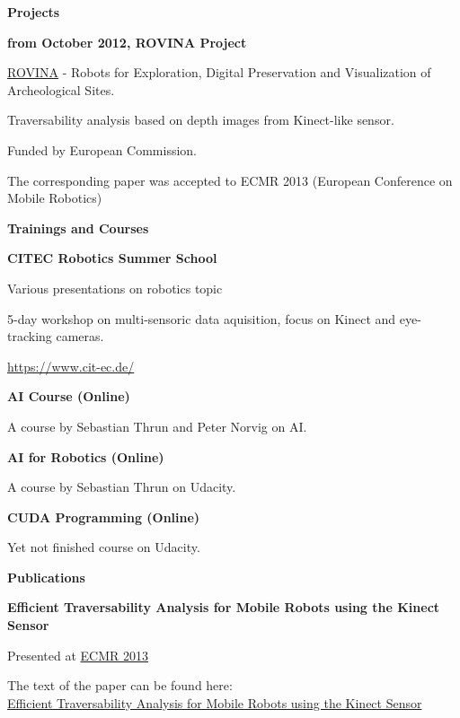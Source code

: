 \documentclass[a4paper,12pt,final]{memoir}
\newcommand{\SmallSep}{\vspace{0.5em}}
\newcommand{\CVSection}[1]
	{\Large\textbf{#1}\par
	\SmallSep\normalsize\normalfont}
\newcommand{\CVItem}[1]
	{\textbf{\color{MidnightBlue} #1}}
\begin{document}
\CVSection{Projects}
\CVItem{from October 2012, ROVINA Project}
\begin{compactitem}[\color{MidnightBlue}$\circ$]
	\item \href{http://www.rovina-project.eu/}{ROVINA}  - Robots for Exploration, Digital Preservation and Visualization of Archeological Sites.
	\item Traversability analysis based on depth images from Kinect-like sensor.
	\item Funded by European Commission.
	\item The corresponding paper was accepted to ECMR 2013 (European Conference on Mobile Robotics)
\end{compactitem}
\SmallSep

\CVSection{Trainings and Courses}
\CVItem{CITEC Robotics Summer School}
\begin{compactitem}[\color{MidnightBlue}$\circ$]
	\item Various presentations on robotics topic
	\item 5-day workshop on multi-sensoric data aquisition, focus on Kinect and eye-tracking cameras.
	\item \href{https://www.cit-ec.de/}{https://www.cit-ec.de/} 
\end{compactitem}
\SmallSep

\CVItem{AI Course (Online)}
\begin{compactitem}[\color{MidnightBlue}$\circ$]
	\item A course by Sebastian Thrun and Peter Norvig on AI.
\end{compactitem}
\SmallSep

\CVItem{AI for Robotics (Online)}
\begin{compactitem}[\color{MidnightBlue}$\circ$]
	\item A course by Sebastian Thrun on Udacity.
\end{compactitem}
\SmallSep

\CVItem{CUDA Programming (Online)}
\begin{compactitem}[\color{MidnightBlue}$\circ$]
	\item Yet not finished course on Udacity.
\end{compactitem}
\SmallSep

\CVSection{Publications}
\CVItem{Efficient Traversability Analysis for Mobile Robots using the Kinect Sensor}
\begin{compactitem}[\color{MidnightBlue}$\circ$]
	\item Presented at \href{http://www.iri.upc.edu/ecmr13/#home}{ECMR 2013} 
	\item The text of the paper can be found here: \\\href{http://www.informatik.uni-freiburg.de/~stachnis/pdf/bogoslavskyi13ecmr.pdf}{Efficient Traversability Analysis for Mobile Robots using the Kinect Sensor} 
\end{compactitem}
\SmallSep
\end{document}
